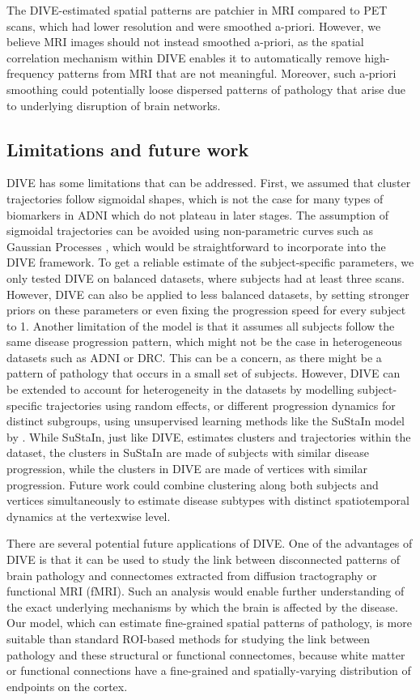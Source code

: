 The DIVE-estimated spatial patterns are patchier in MRI compared to PET scans, which had lower resolution and were smoothed a-priori. However, we believe MRI images should not instead smoothed a-priori, as the spatial correlation mechanism within DIVE enables it to automatically remove high-frequency patterns from MRI that are not meaningful.  Moreover, such a-priori smoothing could potentially loose dispersed patterns of pathology that arise due to underlying disruption of brain networks.



\subsection{Limitations and future work}

DIVE has some limitations that can be addressed. First, we assumed that cluster trajectories follow sigmoidal shapes, which is not the case for many types of biomarkers in ADNI which do not plateau in later stages. The assumption of sigmoidal trajectories can be avoided using non-parametric curves such as Gaussian Processes \cite{lorenzi2017disease}, which would be straightforward to incorporate into the DIVE framework. To get a reliable estimate of the subject-specific parameters, we only tested DIVE on balanced datasets, where subjects had at least three scans. However, DIVE can also be applied to less balanced datasets, by setting stronger priors on these parameters or even fixing the progression speed for every subject to 1. Another limitation of the model is that it assumes all subjects follow the same disease progression pattern, which might not be the case in heterogeneous datasets such as ADNI or DRC. This can be a concern, as there might be a pattern of pathology that occurs in a small set of subjects. However, DIVE can be extended to account for heterogeneity in the datasets by modelling subject-specific trajectories using random effects, or different progression dynamics for distinct subgroups, using unsupervised learning methods like the SuStaIn model by \cite{young2018uncovering}. While SuStaIn, just like DIVE, estimates clusters and trajectories within the dataset, the clusters in SuStaIn are made of subjects with similar disease progression, while the clusters in DIVE are made of vertices with similar progression. Future work could combine clustering along both subjects and vertices simultaneously to estimate disease subtypes with distinct spatiotemporal dynamics at the vertexwise level.

There are several potential future applications of DIVE. One of the advantages of DIVE is that it can be used to study the link between disconnected patterns of brain pathology and connectomes extracted from diffusion tractography or functional MRI (fMRI). Such an analysis would enable further understanding of the exact underlying mechanisms by which the brain is affected by the disease. Our model, which can estimate fine-grained spatial patterns of pathology, is more suitable than standard ROI-based methods for studying the link between pathology and these structural or functional connectomes, because white matter or functional connections have a fine-grained and spatially-varying distribution of endpoints on the cortex.


